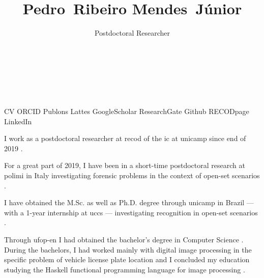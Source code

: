 

\title{Pedro~Ribeiro Mendes~Júnior}

\author{Postdoctoral Researcher\\%
  \\%
  \\%
  \\%
  \\%
}
\date{}



\maketitle

\begin{tags}
  \gls{CV}
  \gls{ORCID}
  \gls{Publons}
  \gls{Lattes}
  \gls{GoogleScholar}
  \gls{ResearchGate}
  \gls{Github}
  \gls{RECODpage}
  \gls{LinkedIn}
\end{tags}

I work as a postdoctoral researcher at \gls{recod} of the \gls{ic} at \gls{unicamp} since end of 2019 .

For a great part of 2019, I have been in a short-time postdoctoral research at \gls{polimi} in Italy investigating forensic problems in the context of open-set scenarios .

I have obtained the M.Sc.  as well as Ph.D. degree  through \gls{unicamp} in Brazil --- with a 1-year internship at \gls{uccs} ---  investigating recognition in open-set scenarios .

Through \gls{ufop-en} I had obtained the bachelor's degree in Computer Science .
During the bachelors, I had worked mainly with digital image processing in the specific problem of vehicle license plate location  and I concluded my education studying the Haskell functional programming language for image processing .

